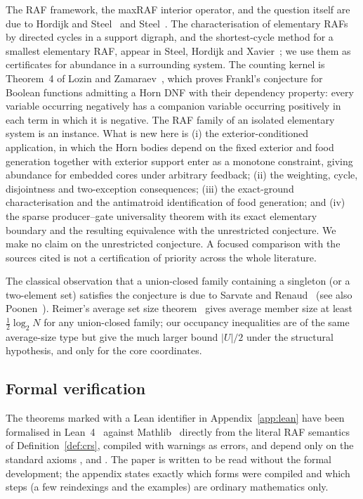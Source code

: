 \documentclass[11pt,a4paper]{article}
\theoremstyle{plain}
\theoremstyle{definition}
\theoremstyle{remark}
\begin{document}
The RAF framework, the maxRAF interior operator, and the question itself are due to
Hordijk and Steel~\cite{hordijk2004detecting} and Steel~\cite{steel2023interior}. The
characterisation of elementary RAFs by directed cycles in a support digraph, and the
shortest-cycle method for a smallest elementary RAF, appear in
Steel, Hordijk and Xavier~\cite{steel2019autocatalytic}; we use them as certificates
for abundance in a surrounding system. The counting kernel is Theorem~4 of Lozin and
Zamaraev~\cite{lozin2024union}, which proves Frankl's conjecture for Boolean functions
admitting a Horn DNF with their dependency property: every variable occurring negatively
has a companion variable occurring positively in each term in which it is negative. The
RAF family of an isolated elementary system is an instance. What is new here is (i) the
exterior-conditioned application, in which the Horn bodies depend on the fixed exterior
and food generation together with exterior support enter as a monotone constraint,
giving abundance for embedded cores under arbitrary feedback; (ii) the
weighting, cycle, disjointness and two-exception consequences; (iii) the exact-ground
characterisation and the antimatroid identification of food generation; and (iv) the
sparse producer--gate universality theorem with its exact elementary boundary and the
resulting equivalence with the unrestricted conjecture. We make no claim on the
unrestricted conjecture. A focused comparison with the sources cited is not a
certification of priority across the whole literature.

The classical observation that a union-closed family containing a singleton (or a
two-element set) satisfies the conjecture is due to Sarvate and Renaud~\cite{sarvate1989union}
(see also Poonen~\cite{poonen1992union}). Reimer's average set size
theorem~\cite{reimer2003average} gives average member size at least $\tfrac12\log_2 N$ for any
union-closed family; our occupancy inequalities are of the same average-size type but give
the much larger bound $|U|/2$ under the structural hypothesis, and only for the core
coordinates.

\subsection{Formal verification}

The theorems marked with a Lean identifier in Appendix~\ref{app:lean} have been formalised
in Lean~4~\cite{demoura2021lean} against Mathlib~\cite{mathlib2020} directly from the
literal RAF semantics of Definition~\ref{def:crs}, compiled with warnings as errors, and
depend only on the standard axioms ,  and
. The paper is written to be read without the formal development; the
appendix states exactly which forms were compiled and which steps (a few reindexings and
the examples) are ordinary mathematics only.
\end{document}
